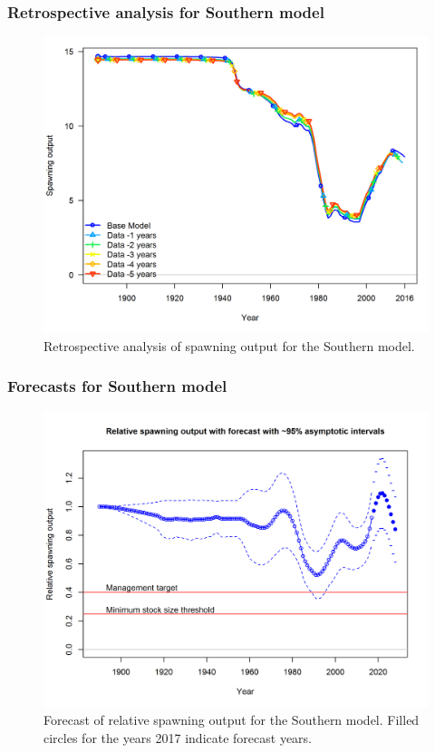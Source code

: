\documentclass[12pt,]{article}
\begin{document}
\FloatBarrier

\subsubsection{Retrospective analysis for Southern
model}\label{retrospective-analysis-for-southern-model}

\begin{figure}[htbp]
\centering
\includegraphics{Figures/retrospectives/retro.S_compare1_spawnbio.png}
\caption{Retrospective analysis of spawning output for the Southern
model. \label{fig:retro.S}}
\end{figure}

\FloatBarrier

\subsubsection{Forecasts for Southern
model}\label{forecasts-for-southern-model}

\begin{figure}[htbp]
\centering
\includegraphics{r4ss/plots_mod2/ts9_Relative_spawning_output_with_forecast_with_95_asymptotic_intervals_forecast_intervals.png}
\caption{Forecast of relative spawning output for the Southern model.
Filled circles for the years 2017 indicate forecast years.
\label{fig:forecast.S}}
\end{figure}
\end{document}
